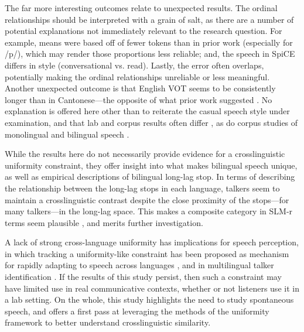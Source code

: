 The far more interesting outcomes relate to unexpected results. The ordinal relationships should be interpreted with a grain of salt, as there are a number of potential explanations not immediately relevant to the research question. For example, means were based off of fewer tokens than in prior work (especially for /p/), which may render those proportions less reliable; and, the speech in SpiCE differs in style (conversational vs. read). Lastly, the error often overlaps, potentially making the ordinal relationships unreliable or less meaningful. Another unexpected outcome is that English VOT seems to be consistently longer than in Cantonese---the opposite of what prior work suggested \citep{clumeck_1981_cantonese,lisker_1964_vot}. No explanation is offered here other than to reiterate the casual speech style under examination, and that lab and corpus results often differ \citep{gahl_2012_reduce}, as do corpus studies of monolingual and bilingual speech \citep{johnson_2019_probabilistic}. 

While the results here do not necessarily provide evidence for a crosslinguistic uniformity constraint, they offer insight into what makes bilingual speech unique, as well as empirical descriptions of bilingual long-lag stop. In terms of describing the relationship between the long-lag stops in each language, talkers seem to maintain a crosslinguistic contrast despite the close proximity of the stops---for many talkers---in the long-lag space. This makes a composite category in SLM-r terms seem plausible \citep{flege_2021_slmr}, and merits further investigation. 

A lack of strong cross-language uniformity has implications for speech perception, in which tracking a uniformity-like constraint has been proposed as mechanism for rapidly adapting to speech across languages \citep{reinisch_2013_retune}, and in multilingual talker identification \citep{orena_2019_identifying}. If the results of this study persist, then such a constraint may have limited use in real communicative contexts, whether or not listeners use it in a lab setting. On the whole, this study highlights the need to study spontaneous speech, and offers a first pass at leveraging the methods of the uniformity framework to better understand crosslinguistic similarity.

\endinput %